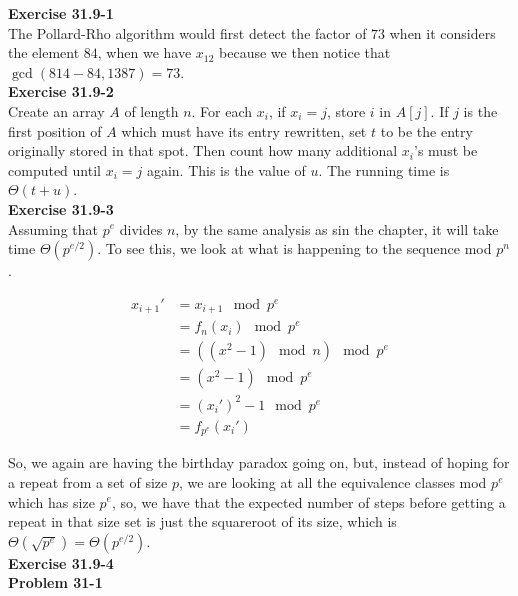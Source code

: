 \documentclass{article}
\begin{document}
\noindent\textbf{Exercise 31.9-1}\\

The Pollard-Rho algorithm would first detect the factor of $73$ when it considers the element $84$, when we have $x_{12}$ because we then notice that $\gcd(814-84,1387) = 73$.\\

\noindent\textbf{Exercise 31.9-2}\\ 

Create an array $A$ of length $n$.  For each $x_i$, if $x_i = j$, store $i$ in $A[j]$.  If $j$ is the first position of $A$ which must have its entry rewritten, set $t$ to be the entry originally stored in that spot.  Then count how many additional $x_i$'s must be computed until $x_i = j$ again. This is the value of $u$.  The running time is $\Theta(t+u)$. \\

\noindent\textbf{Exercise 31.9-3}\\

Assuming that $p^e$ divides $n$, by the same analysis as sin the chapter, it will take time $\Theta(p^{e/2})$. To see this, we look at what is happening to the sequence mod $p^n$.

\begin{align*}
x_{i+1}' &= x_{i+1} \mod p^e\\
& = f_n(x_i) \mod p^e\\
&=((x^2-1)\mod n)\mod p^e\\
&=(x^2-1)\mod p^e\\
&= (x_i')^2-1 \mod p^e\\
&=f_{p^e}(x_i')
\end{align*}

So, we again are having the birthday paradox going on, but, instead of hoping for a repeat from a set of size $p$, we are looking at all the equivalence classes mod $p^e$ which has size $p^e$, so, we have that the expected number of steps before getting a repeat in that size set is just the squareroot of its size, which is $\Theta(\sqrt{p^{e}}) =\Theta(p^{e/2})$. \\

\noindent\textbf{Exercise 31.9-4}\\


\noindent\textbf{Problem 31-1}\\
\end{document}
